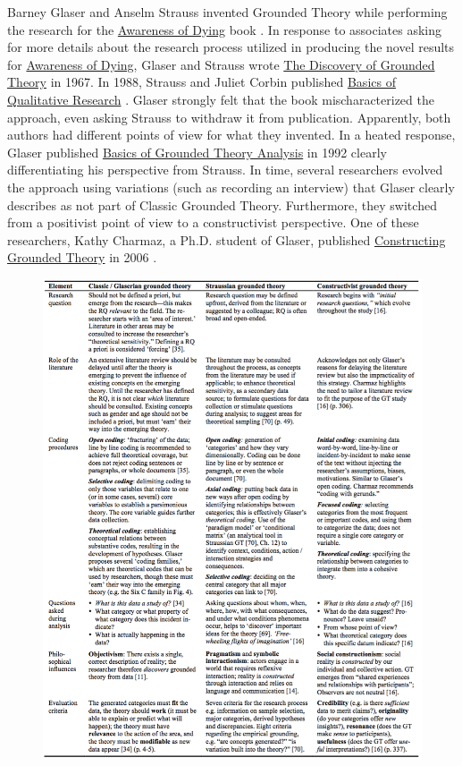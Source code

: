 Barney Glaser and Anselm Strauss invented Grounded Theory while performing the research for the \ul{Awareness of Dying} book \cite{GlaserAwarenessOfDying}. In response to associates asking for more details about the research process utilized in producing the novel results for \ul{Awareness of Dying}, Glaser and Strauss wrote \ul{The Discovery of Grounded Theory} \cite{GlaserDiscovery} in 1967. In 1988, Strauss and Juliet Corbin published \ul{Basics of Qualitative Research} \cite{Strauss1988Basics}. Glaser strongly felt that the book mischaracterized the approach, even asking Strauss to withdraw it from publication. Apparently, both authors had different points of view for what they invented. In a heated response, Glaser published \ul{Basics of Grounded Theory Analysis} in 1992 \cite{GlaserBasics} clearly differentiating his perspective from Strauss.  In time, several researchers evolved the approach using variations (such as recording an interview) that Glaser clearly describes as not part of Classic Grounded Theory. Furthermore, they switched from a positivist point of view to a constructivist perspective. One of these researchers, Kathy Charmaz, a Ph.D. student of Glaser, published \ul{Constructing Grounded Theory} in 2006 \cite{Charmaz}. 

\begin{figure}[h]
\centering
{}
\label{GroundedTheoryComparison}
\includegraphics[width=6.4in]{grounded_theory_images/stohl_grounded_theory_comparison.png}
\end{figure}


